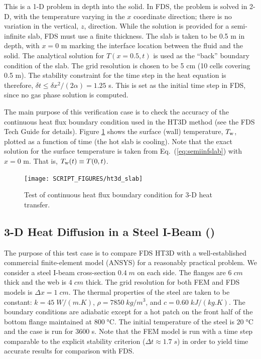 \documentclass[11pt]{book}
\begin{document}
This is a 1-D problem in depth into the solid.  In FDS, the problem is solved in 2-D, with the temperature varying in the $x$ coordinate direction; there is no variation in the vertical, $z$, direction.  While the solution is provided for a semi-infinite slab, FDS must use a finite thickness.  The slab is taken to be 0.5 m in depth, with $x=0$ m marking the interface location between the fluid and the solid.  The analytical solution for $T(x=0.5,t)$ is used as the ``back'' boundary condition of the slab.  The grid resolution is chosen to be 5 cm (10 cells covering 0.5 m).  The stability constraint for the time step in the heat equation is therefore, $\delta t \le \delta x^2/(2\alpha) = 1.25$ s.  This is set as the initial time step in FDS, since no gas phase solution is computed.

The main purpose of this verification case is to check the accuracy of the continuous heat flux boundary condition used in the HT3D method (see the FDS Tech Guide \cite{FDS_Math_Guide} for details).  Figure \ref{fig:ht3d_slab} shows the surface (wall) temperature, $T_{\rm w}$, plotted as a function of time (the hot slab is cooling).  Note that the exact solution for the surface temperature is taken from Eq.~(\ref{eq:semiinfslab}) with $x=0$ m.  That is, $T_{\rm w}(t) \equiv T(0,t)$.

\begin{figure}[ht]
\centering
\texttt{[image: SCRIPT\_FIGURES/ht3d\_slab]}
\caption[The  test cases]{Test of continuous heat flux boundary condition for 3-D heat transfer.}
\label{fig:ht3d_slab}
\end{figure}

\FloatBarrier

\subsection{3-D Heat Diffusion in a Steel I-Beam (\texorpdfstring{}{ht3d\_ibeam})}
\label{ht3d_ibeam}

The purpose of this test case is to compare FDS HT3D with a well-established commercial finite-element model (ANSYS) for a reasonably practical problem.  We consider a steel I-beam cross-section $0.4 \;\si{m}$ on each side.  The flanges are $6 \;\si{cm}$ thick and the web is $4 \;\si{cm}$ thick.  The grid resolution for both FEM and FDS models is $\Delta x = 1 \;\si{cm}$.  The thermal properties of the steel are taken to be constant: $k=45 \;\si{W/(m.K)}$, $\rho=7850 \;\si{kg/m^3}$, and $c = 0.60 \;\si{kJ/(kg.K)}$.  The boundary conditions are adiabatic except for a hot patch on the front half of the bottom flange maintained at $800 \;\si{\degreeCelsius}$.  The initial temperature of the steel is $20 \;\si{\degreeCelsius}$ and the case is run for 3600 s.  Note that the FEM model is run with a time step comparable to the explicit stability criterion ($\Delta t \approx 1.7 \;\si{s}$) in order to yield time accurate results for comparison with FDS.
\end{document}
